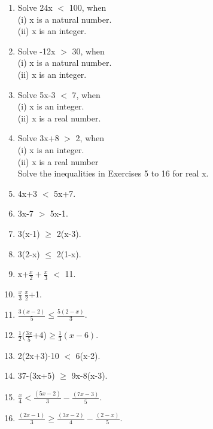 \renewcommand{\theequation}{\theenumi}
\begin{enumerate}[label=\arabic*.,ref=\thesubsection.\theenumi]

	\item Solve 24x $<$ 100, when\\
	(i) x is a natural number.\\
	(ii) x is an integer.\\
	\item Solve -12x $>$ 30, when\\
	(i) x is a natural number.\\
	(ii) x is an integer.\\
	\item Solve 5x-3 $<$ 7, when\\
	(i) x is an integer.\\
	(ii) x is a real number.\\
	\item Solve 3x+8 $>$ 2, when\\
	(i) x is an integer.\\
	(ii) x is a real number\\
	
Solve the inequalities in Exercises 5 to 16 for real x.\\
	\item 4x+3 $<$ 5x+7.\\
	\item 3x-7 $>$ 5x-1.\\
	\item 3(x-1) $\geq$ 2(x-3).\\
	\item 3(2-x) $\leq$ 2(1-x).\\
	\item x+$\frac{x}{2}+\frac{x}{3}$ $<$ 11.\\
	\item $\frac{x}{3}\>\frac{x}{2}$+1.\\
	\item $\frac{3(x-2)}{5}\leq\frac{5(2-x)}{3}$.\\
	\item $ \frac{1}{2}$($\frac{3x}{5}$+4)$\geq\frac{1}{3}(x-6)$.\\
	\item 2(2x+3)-10 $<$ 6(x-2).\\
	\item 37-(3x+5) $\geq$ 9x-8(x-3).\\
	\item $\frac{x}{4}<\frac{(5x-2)}{3}-\frac{(7x-3)}{5}$.\\
	\item $\frac{(2x-1)}{3}\geq\frac{(3x-2)}{4}-\frac{(2-x)}{5}$.\\
	

\end{enumerate}
